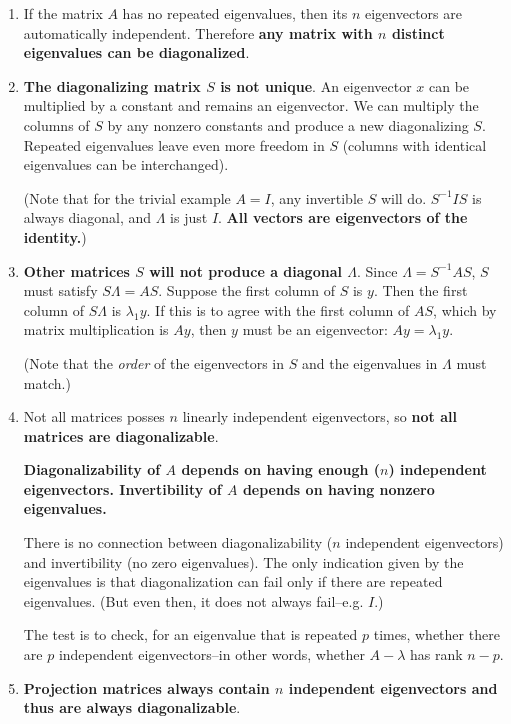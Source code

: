 \begin{enumerate}[1.]

\item If the matrix \(A\) has no repeated eigenvalues, then its \(n\) eigenvectors are automatically independent. Therefore \textbf{any matrix with \(n\) distinct eigenvalues can be diagonalized}.

\item \textbf{The diagonalizing matrix \(S\) is not unique}. An eigenvector \(x\) can be multiplied by a constant and remains an eigenvector. We can multiply the columns of \(S\) by any nonzero constants and produce a new diagonalizing \(S\). Repeated eigenvalues leave even more freedom in \(S\) (columns with identical eigenvalues can be interchanged). 

(Note that for the trivial example \(A = I\), any invertible \(S\) will do. \(S^{-1}IS\) is always diagonal, and \(\Lambda\) is just \(I\). \textbf{All vectors are eigenvectors of the identity.})

\item \textbf{Other matrices \(S\) will not produce a diagonal \(\Lambda\)}. Since \(\Lambda = S^{-1}AS\), \(S\) must satisfy \(S \Lambda = AS\). Suppose the first column of \(S\) is \(y\). Then the first column of \(S \Lambda\) is \(\lambda_1y\). If this is to agree with the first column of \(AS\), which by matrix multiplication is \(Ay\), then \(y\) must be an eigenvector: \(Ay = \lambda_1y\). 

(Note that the \textit{order} of the eigenvectors in \(S\) and the eigenvalues in \(\Lambda\) must match.)

\item Not all matrices posses \(n\) linearly independent eigenvectors, so \textbf{not all matrices are diagonalizable}. 

\textbf{Diagonalizability of \(A\) depends on having enough (\(n\)) independent eigenvectors. Invertibility of \(A\) depends on having nonzero eigenvalues.}

There is no connection between diagonalizability (\(n\) independent eigenvectors) and invertibility (no zero eigenvalues). The only indication given by the eigenvalues is that diagonalization can fail only if there are repeated eigenvalues. (But even then, it does not always fail--e.g. \(I\).)

The test is to check, for an eigenvalue that is repeated \(p\) times, whether there are \(p\) independent eigenvectors--in other words, whether \(A - \lambda\) has rank \(n - p\).


\item \textbf{Projection matrices always contain \(n\) independent eigenvectors and thus are always diagonalizable}.

\end{enumerate}

